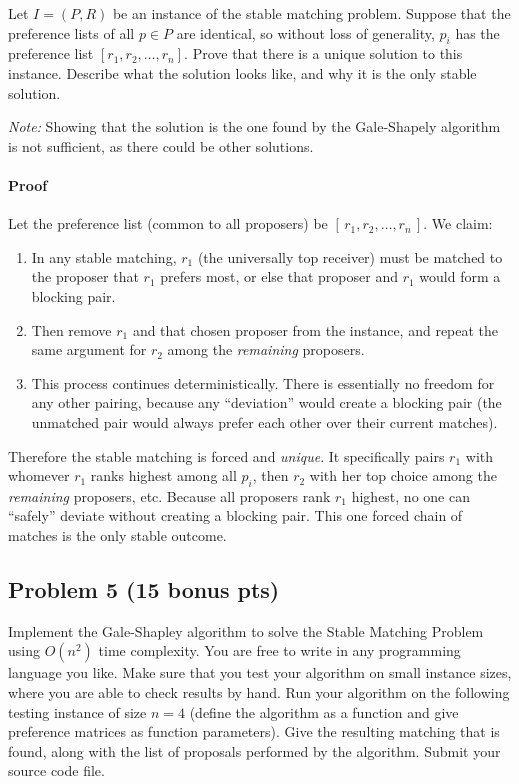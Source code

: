 \documentclass[12pt]{article}
\begin{document}
Let $I = (P, R)$ be an instance of the stable matching problem. Suppose that the preference lists of all $p \in P$ are identical, so without loss of generality, $p_i$ has the preference list $[r_1, r_2, \ldots, r_n]$. Prove that there is a unique solution to this instance. Describe what the solution looks like, and why it is the only stable solution.

\textit{Note:} Showing that the solution is the one found by the Gale-Shapely algorithm is not sufficient, as there could be other solutions.

\paragraph{Proof} 
Let the preference list (common to all proposers) be $[\,r_1, r_2, \dots, r_n\,]$. We claim:
\begin{enumerate}
    \item In any stable matching, $r_1$ (the universally top receiver) must be matched to the proposer that $r_1$ prefers most, or else that proposer and $r_1$ would form a blocking pair.
    \item Then remove $r_1$ and that chosen proposer from the instance, and repeat the same argument for $r_2$ among the \emph{remaining} proposers.
    \item This process continues deterministically. There is essentially no freedom for any other pairing, because any ``deviation'' would create a blocking pair (the unmatched pair would always prefer each other over their current matches).
\end{enumerate}
Therefore the stable matching is forced and \emph{unique}. It specifically pairs $r_1$ with whomever $r_1$ ranks highest among all $p_i$, then $r_2$ with her top choice among the \emph{remaining} proposers, etc. Because all proposers rank $r_1$ highest, no one can ``safely'' deviate without creating a blocking pair. This one forced chain of matches is the only stable outcome.

\subsection*{Problem 5 (15 bonus pts)}

Implement the Gale-Shapley algorithm to solve the Stable Matching Problem using $O(n^2)$ time complexity. You are free to write in any programming language you like. Make sure that you test your algorithm on small instance sizes, where you are able to check results by hand. Run your algorithm on the following testing instance of size $n=4$ (define the algorithm as a function and give preference matrices as function parameters). Give the resulting matching that is found, along with the list of proposals performed by the algorithm. Submit your source code file.
\end{document}
